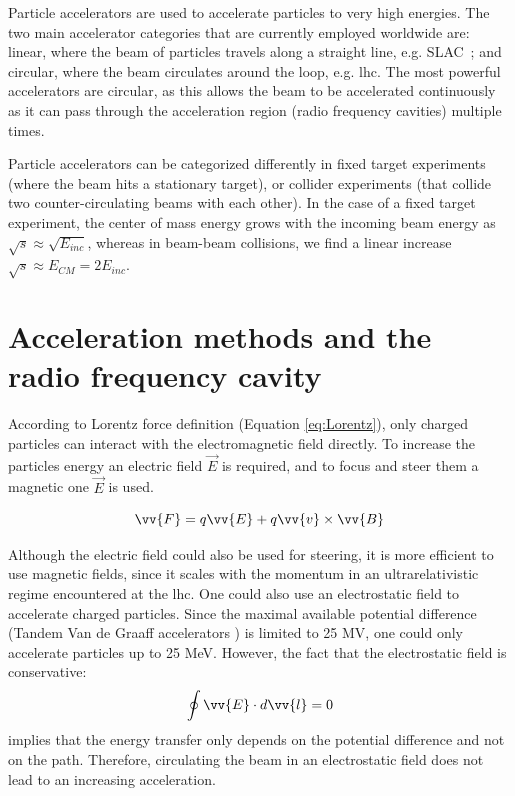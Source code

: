 \documentclass[encoding=utf8,british]{tumphthesis}
\begin{document}
Particle accelerators are used to accelerate particles to very high energies. The two main accelerator categories that are currently employed worldwide are: linear, where the beam of particles travels along a straight line, e.g. SLAC~\cite{SLAC}; and circular, where the beam circulates around the loop, e.g. \acrshort{lhc}. The most powerful accelerators are circular, as this allows the beam to be accelerated continuously as it can pass through the acceleration region (radio frequency cavities) multiple times.

Particle accelerators can be categorized differently in fixed target experiments (where the beam hits a stationary target), or collider experiments (that collide two counter-circulating beams with each other). In the case of a fixed target experiment, the center of mass energy grows with the incoming beam energy as $\sqrt{s} \approx \sqrt{E_{inc}}$, whereas in beam-beam collisions, we find a linear increase $\sqrt{s} \approx  E_{CM} = 2 E_{inc}$.


\section{Acceleration methods and the radio frequency cavity}

According to Lorentz force definition (Equation \ref{eq:Lorentz}), only charged particles can interact with the electromagnetic  field directly. To increase the particles energy an electric field $\vec{E}$ is required, and to focus and steer them a magnetic one $\vec{E}$ is used. 

\begin{equation}
    \vv{F} = q\vv{E} + q\vv{v} \times \vv{B}
    \label{eq:Lorentz}
\end{equation}

Although the electric field could also be used for steering, it is more efficient to use magnetic fields, since it scales with the momentum in an ultrarelativistic regime encountered at the \acrshort{lhc}. One could also use an electrostatic field to accelerate charged particles. Since the maximal available potential difference (Tandem Van de Graaff accelerators \cite{Hinterberger:1005042}) is limited to 25 MV, one could only accelerate particles up to 25 MeV. However, the fact that the electrostatic field is conservative:
\begin{equation}
    \oint \vv{E}\cdot d\vv{l}=0
\end{equation}
implies that the energy transfer only depends on the potential difference and not on the path. Therefore, circulating the beam in an electrostatic field does not lead to an increasing acceleration.
\end{document}
